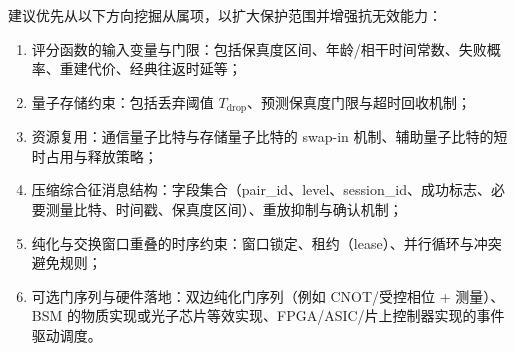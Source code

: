 \documentclass[12pt,a4paper]{article}
\begin{document}
建议优先从以下方向挖掘从属项，以扩大保护范围并增强抗无效能力：
\begin{enumerate}[label=(\arabic*)]
    \item 评分函数的输入变量与门限：包括保真度区间、年龄/相干时间常数、失败概率、重建代价、经典往返时延等；
    \item 量子存储约束：包括丢弃阈值 $T_{\mathrm{drop}}$、预测保真度门限与超时回收机制；
    \item 资源复用：通信量子比特与存储量子比特的 swap-in 机制、辅助量子比特的短时占用与释放策略；
    \item 压缩综合征消息结构：字段集合（pair\_id、level、session\_id、成功标志、必要测量比特、时间戳、保真度区间）、重放抑制与确认机制；
    \item 纯化与交换窗口重叠的时序约束：窗口锁定、租约（lease）、并行循环与冲突避免规则；
    \item 可选门序列与硬件落地：双边纯化门序列（例如 CNOT/受控相位 + 测量）、BSM 的物质实现或光子芯片等效实现、FPGA/ASIC/片上控制器实现的事件驱动调度。
\end{enumerate}
\end{document}
